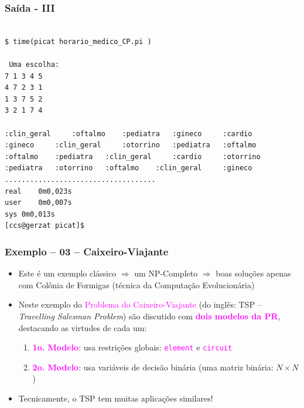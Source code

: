 \begin{frame}[fragile]

\frametitle{Saída - III}

\begin{footnotesize}
\begin{verbatim}

$ time(picat horario_medico_CP.pi )

 Uma escolha:
7 1 3 4 5 
4 7 2 3 1 
1 3 7 5 2 
3 2 1 7 4 

:clin_geral 	:oftalmo 	:pediatra 	:gineco 	:cardio 	
:gineco 	:clin_geral 	:otorrino 	:pediatra 	:oftalmo 	
:oftalmo 	:pediatra 	:clin_geral 	:cardio 	:otorrino 	
:pediatra 	:otorrino 	:oftalmo 	:clin_geral 	:gineco 	
....................................
real	0m0,023s
user	0m0,007s
sys	0m0,013s
[ccs@gerzat picat]$ 
\end{verbatim}
  
\end{footnotesize}
\end{frame}
\begin{frame}[fragile] 

\label{3o_exemplo}
\frametitle{Exemplo -- 03 -- Caixeiro-Viajante}

\begin{itemize}
\item Este é um exemplo clássico $\Rightarrow $ um NP-Completo $\Rightarrow $ boas soluções
apenas com Colônia de Formigas (técnica da Computação Evolucionária)

\pause
\item Neste exemplo do \textcolor{magenta}{Problema do Caixeiro-Viajante}
 (do inglês: TSP -- \textit{Travelling Salesman Problem}) são discutido com \textcolor{magenta}{\textbf{dois modelos da PR}}, 
 destacando as virtudes de cada um:

\begin{enumerate}
   \item \textcolor{magenta}{\textbf{1o. Modelo}}: usa  restrições globais: \textcolor{magenta}{\texttt{element}} e \textcolor{magenta}{\texttt{circuit}}
  \item  \textcolor{magenta}{\textbf{2o. Modelo}}: usa  variáveis de decisão binária  (uma matriz binária: $N \times N$) 
\end{enumerate}

\pause
\item Tecnicamente, o TSP tem muitas aplicações similares! 
\end{itemize}

\end{frame}

